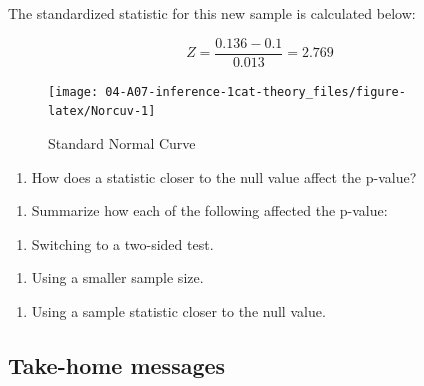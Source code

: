 \documentclass[
]{report}
\providecommand{\tightlist}{%
  \setlength{\itemsep}{0pt}\setlength{\parskip}{0pt}}
\begin{document}
The standardized statistic for this new sample is calculated below:

\[Z = \frac{0.136-0.1}{0.013} = 2.769\]

\begin{figure}

{\centering \texttt{[image: 04-A07-inference-1cat-theory\_files/figure-latex/Norcuv-1]} 

}

\caption{Standard Normal Curve}\label{fig:Norcuv}
\end{figure}

\begin{enumerate}
\def\labelenumi{\arabic{enumi}.}
\setcounter{enumi}{12}
\tightlist
\item
  How does a statistic closer to the null value affect the p-value?
\end{enumerate}

\vspace{0.3in}

\begin{enumerate}
\def\labelenumi{\arabic{enumi}.}
\setcounter{enumi}{13}
\tightlist
\item
  Summarize how each of the following affected the p-value:
\end{enumerate}

\begin{enumerate}
\def\labelenumi{\alph{enumi})}
\tightlist
\item
  Switching to a two-sided test.
\end{enumerate}

\vspace{0.4in}

\begin{enumerate}
\def\labelenumi{\alph{enumi})}
\setcounter{enumi}{1}
\tightlist
\item
  Using a smaller sample size.
\end{enumerate}

\vspace{0.4in}

\begin{enumerate}
\def\labelenumi{\alph{enumi})}
\setcounter{enumi}{2}
\tightlist
\item
  Using a sample statistic closer to the null value.
\end{enumerate}

\vspace{0.4in}

\subsection{Take-home messages}\label{take-home-messages-6}
\end{document}
